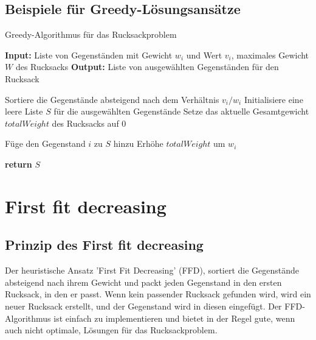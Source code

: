 \documentclass[12pt]{report}
\begin{document}
\section{Beispiele für Greedy-Lösungsansätze}
\begin{algorithm}
	\caption{Greedy-Algorithmus für das Rucksackproblem}
	\begin{algorithmic}[1]
		\State \textbf{Input:} Liste von Gegenständen mit Gewicht $w_i$ und Wert $v_i$, maximales Gewicht $W$ des Rucksacks
		\State \textbf{Output:} Liste von ausgewählten Gegenständen für den Rucksack
		
		\State Sortiere die Gegenstände absteigend nach dem Verhältnis $v_i/w_i$
		\State Initialisiere eine leere Liste $S$ für die ausgewählten Gegenstände
		\State Setze das aktuelle Gesamtgewicht $totalWeight$ des Rucksacks auf $0$
		
		\State Füge den Gegenstand $i$ zu $S$ hinzu
		\State Erhöhe $totalWeight$ um $w_i$
		\EndIf
		\EndFor
		
		\State \textbf{return} $S$
	\end{algorithmic}
\end{algorithm}


\newpage
\chapter{First fit decreasing}
\section{Prinzip des First fit decreasing}
Der heuristische Ansatz 'First Fit Decreasing' (FFD), sortiert die Gegenstände absteigend nach ihrem Gewicht und packt jeden Gegenstand in den ersten Rucksack, in den er passt. Wenn kein passender Rucksack gefunden wird, wird ein neuer Rucksack erstellt, und der Gegenstand wird in diesen eingefügt. Der FFD-Algorithmus ist einfach zu implementieren und bietet in der Regel gute, wenn auch nicht optimale, Lösungen für das Rucksackproblem. \cite{martello1987algorithms}
\end{document}

